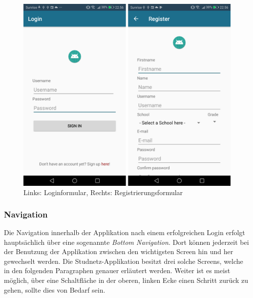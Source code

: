 \documentclass[../main.tex]{subfiles}
\begin{document}
\begin{figure} 
	\centering
	\includegraphics[width=\textwidth]{./images/login_register.pdf}
	\caption{Links: Loginformular, Rechts: Registrierungsformular}
	\label{login_register}
\end{figure}

\subsubsection*{Navigation}
Die Navigation innerhalb der Applikation nach einem erfolgreichen Login erfolgt hauptsächlich über eine sogenannte \emph{Bottom Navigation}. Dort können jederzeit bei der Benutzung der Applikation zwischen den wichtigsten Screen hin und her gewechselt werden. Die Studnetz-Applikation besitzt drei solche Screens, welche in den folgenden Paragraphen genauer erläutert werden. Weiter ist es meist möglich, über eine Schaltfläche in der oberen, linken Ecke einen Schritt zurück zu gehen, sollte dies von Bedarf sein.
\end{document}
